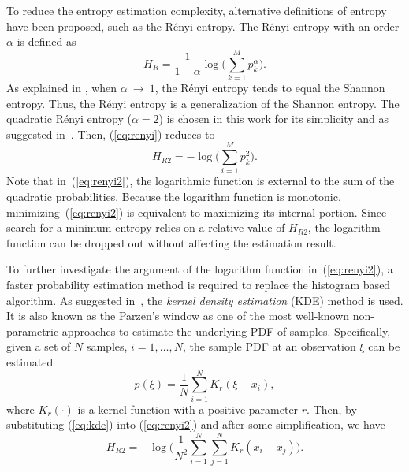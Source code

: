 \documentclass[journal,comsoc]{IEEEtran}
\begin{document}
To reduce the entropy estimation complexity, alternative definitions of entropy have been proposed, such as the R\'enyi entropy.
The R\'enyi entropy  with an order \(\alpha\) is defined as \cite{renyi1961measures}
\begin{equation}
H_{R }={\frac {1}{1-\alpha }}\log {\Bigg (}\sum _{k=1}^{M}p_{k}^{\alpha }{\Bigg )}.
\label{eq:renyi}
\end{equation}
As explained in \cite{Bromiley2004}, when $\alpha~\to~1$, the R\'enyi entropy tends to equal the Shannon entropy.
Thus, the R\'enyi entropy is a generalization of the Shannon entropy.
The quadratic R\'enyi entropy ($\alpha=2$) is chosen in this work for its simplicity and as suggested in~\cite{Santamaria2002}.
Then, (\ref{eq:renyi}) reduces to
\begin{equation}
H_{R2 }=-\log {\Bigg (}\sum _{i=1}^{M}p_{k}^{2 }{\Bigg )}.
\label{eq:renyi2}
\end{equation}
Note that in~(\ref{eq:renyi2}), the logarithmic function is  external to the sum of the quadratic probabilities.
Because the logarithm function is monotonic, minimizing~(\ref{eq:renyi2}) is equivalent to maximizing its internal portion.
Since search for a minimum entropy relies on a relative value of \(H_{R2 }\),
the logarithm function can be dropped out without affecting the estimation result.
% 
% 

To further investigate the argument of the logarithm function in~(\ref{eq:renyi2}), a faster probability estimation method is required to replace the histogram based algorithm.
As suggested in~\cite{Principe2000a}, the \textit{kernel density estimation} (KDE) method is used.
It is also known as the Parzen's window \cite{Parzen1962} as one of the most well-known non-parametric approaches to estimate the underlying PDF of samples. 
% 
% 
Specifically, given a set of \(N\) samples, \(i=1, \dots, N\), the sample PDF at an observation \(\xi\) can be estimated 
\begin{equation}
{ p(\xi)={\frac {1}{N}}\sum _{i=1}^{N}K_{r}\left(\xi-x_i\right)},
\label{eq:kde}
\end{equation}
where $K_r(\cdot)$ is a kernel function with a positive parameter $r$.
Then, by substituting (\ref{eq:kde}) into (\ref{eq:renyi2}) and after some simplification, we have
\begin{equation}
H_{R2 }=-\log {\Bigg (}\frac{1}{N^2}\sum _{i=1}^{N}\sum _{j=1}^{N}K_{r}\left(x_i-x_j\right){\Bigg )}.
\label{eq:ker_ent_est}
\end{equation}
\end{document}
